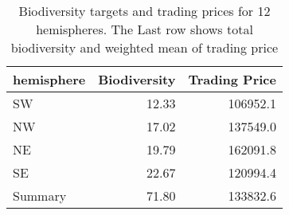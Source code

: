 \begin{table}

\caption{\label{tab:pro-trading-prices}Biodiversity targets and trading prices for 12 hemispheres. The Last row shows total biodiversity and weighted mean of trading price}
\centering
\begin{tabular}[t]{l|r|r}
\hline
hemisphere & Biodiversity & Trading Price\\
\hline
SW & 12.33 & 106952.1\\
\hline
NW & 17.02 & 137549.0\\
\hline
NE & 19.79 & 162091.8\\
\hline
SE & 22.67 & 120994.4\\
\hline
Summary & 71.80 & 133832.6\\
\hline
\end{tabular}
\end{table}